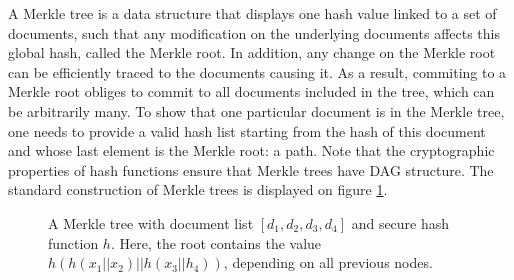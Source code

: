 A Merkle tree is a data structure that displays one hash value linked to a set of documents, such that any modification on the underlying documents affects this global hash, called the Merkle root. In addition, any change on the Merkle root can be efficiently traced to the documents causing it. As a result, commiting to a Merkle root obliges to commit to all documents included in the tree, which can be arbitrarily many. To show that one particular document is in the Merkle tree, one needs to provide a valid hash list starting from the hash of this document and whose last element is the Merkle root: a path. Note that the cryptographic properties of hash functions ensure that Merkle trees have DAG structure. The standard construction of Merkle trees is displayed on figure \ref{merkle_fig}.

\begin{figure}
\label{merkle_fig}
\centering
{}
\caption{A Merkle tree with document list $[d_1,d_2,d_3,d_4]$ and secure hash function $h$. Here, the root contains the value $h(h(x_1||x_2)||h(x_3||h_4))$, depending on all previous nodes.}%
\end{figure}


